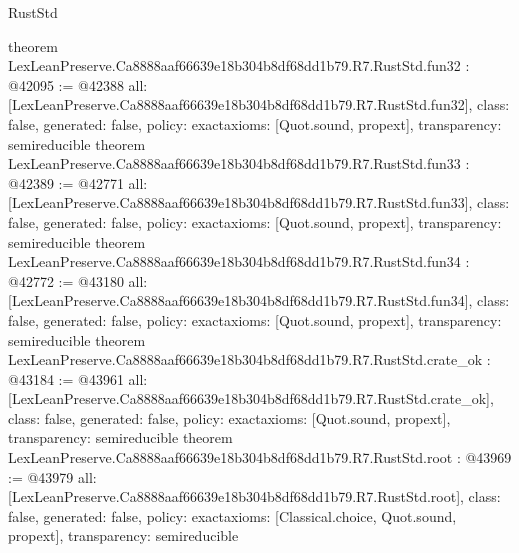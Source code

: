 \begin{lexlean}{RustStd}
\begin{coremodule}
{}
theorem LexLeanPreserve.Ca8888aaf66639e18b304b8df68dd1b79.R7.RustStd.fun32 : @42095 := @42388 {
  all: [LexLeanPreserve.Ca8888aaf66639e18b304b8df68dd1b79.R7.RustStd.fun32],
  class: false,
  generated: false,
  policy: exact{axioms: [Quot.sound, propext]},
  transparency: semireducible
}
theorem LexLeanPreserve.Ca8888aaf66639e18b304b8df68dd1b79.R7.RustStd.fun33 : @42389 := @42771 {
  all: [LexLeanPreserve.Ca8888aaf66639e18b304b8df68dd1b79.R7.RustStd.fun33],
  class: false,
  generated: false,
  policy: exact{axioms: [Quot.sound, propext]},
  transparency: semireducible
}
theorem LexLeanPreserve.Ca8888aaf66639e18b304b8df68dd1b79.R7.RustStd.fun34 : @42772 := @43180 {
  all: [LexLeanPreserve.Ca8888aaf66639e18b304b8df68dd1b79.R7.RustStd.fun34],
  class: false,
  generated: false,
  policy: exact{axioms: [Quot.sound, propext]},
  transparency: semireducible
}
theorem LexLeanPreserve.Ca8888aaf66639e18b304b8df68dd1b79.R7.RustStd.crate_ok : @43184 := @43961 {
  all: [LexLeanPreserve.Ca8888aaf66639e18b304b8df68dd1b79.R7.RustStd.crate_ok],
  class: false,
  generated: false,
  policy: exact{axioms: [Quot.sound, propext]},
  transparency: semireducible
}
theorem LexLeanPreserve.Ca8888aaf66639e18b304b8df68dd1b79.R7.RustStd.root : @43969 := @43979 {
  all: [LexLeanPreserve.Ca8888aaf66639e18b304b8df68dd1b79.R7.RustStd.root],
  class: false,
  generated: false,
  policy: exact{axioms: [Classical.choice, Quot.sound, propext]},
  transparency: semireducible
}


\end{coremodule}
\end{lexlean}
